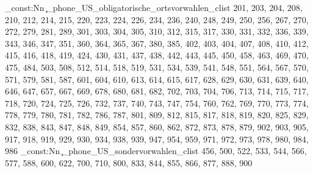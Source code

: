 \clist_const:Nn \c_phone_US_obligatorische_ortsvorwahlen_clist {201,
203,
204,
208,
210,
212,
214,
215,
220,
223,
224,
226,
234,
236,
240,
248,
249,
250,
256,
267,
270,
272,
279,
281,
289,
301,
303,
304,
305,
310,
312,
315,
317,
330,
331,
332,
336,
339,
343,
346,
347,
351,
360,
364,
365,
367,
380,
385,
402,
403,
404,
407,
408,
410,
412,
415,
416,
418,
419,
424,
430,
431,
437,
438,
442,
443,
445,
450,
458,
463,
469,
470,
475,
484,
503,
508,
512,
514,
518,
519,
531,
534,
539,
541,
548,
551,
564,
567,
570,
571,
579,
581,
587,
601,
604,
610,
613,
614,
615,
617,
628,
629,
630,
631,
639,
640,
646,
647,
657,
667,
669,
678,
680,
681,
682,
702,
703,
704,
706,
713,
714,
715,
717,
718,
720,
724,
725,
726,
732,
737,
740,
743,
747,
754,
760,
762,
769,
770,
773,
774,
778,
779,
780,
781,
782,
786,
787,
801,
809,
812,
815,
817,
818,
819,
820,
825,
829,
832,
838,
843,
847,
848,
849,
854,
857,
860,
862,
872,
873,
878,
879,
902,
903,
905,
917,
918,
919,
929,
930,
934,
938,
939,
947,
954,
959,
971,
972,
973,
978,
980,
984,
986}
\clist_const:Nn \c_phone_US_sondervorwahlen_clist {456,
500,
522,
533,
544,
566,
577,
588,
600,
622,
700,
710,
800,
833,
844,
855,
866,
877,
888,
900}

